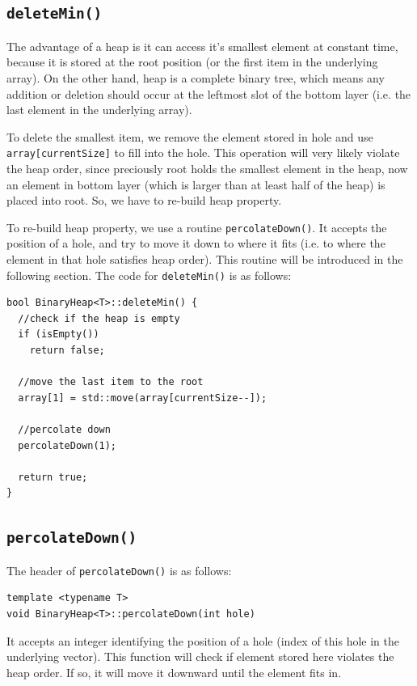 \documentclass[12pt]{book}
\begin{document}
\subsection{\texttt{deleteMin()}}
\label{sec:org3a19483}

The advantage of a heap is it can access it's smallest element at constant time, because it is stored at the root position (or the first item in the underlying array). On the other hand, heap is a complete binary tree, which means any addition or deletion should occur at the leftmost slot of the bottom layer (i.e. the last element in the underlying array).

To delete the smallest item, we remove the element stored in hole and use \texttt{array[currentSize]} to fill into the hole. This operation will very likely violate the heap order, since preciously root holds the smallest element in the heap, now an element in bottom layer (which is larger than at least half of the heap) is placed into root. So, we have to re-build heap property.

To re-build heap property, we use a routine \texttt{percolateDown()}. It accepts the position of a hole, and try to move it down to where it fits (i.e. to where the element in that hole satisfies heap order). This routine will be introduced in the following section. The code for \texttt{deleteMin()} is as follows:
\begin{verbatim}
bool BinaryHeap<T>::deleteMin() {
  //check if the heap is empty 
  if (isEmpty())
    return false;

  //move the last item to the root
  array[1] = std::move(array[currentSize--]);

  //percolate down
  percolateDown(1);

  return true;
}
\end{verbatim}

\subsection{\texttt{percolateDown()}}
\label{sec:org97b85f5}

The header of \texttt{percolateDown()} is as follows:
\begin{verbatim}
template <typename T>
void BinaryHeap<T>::percolateDown(int hole)
\end{verbatim}

It accepts an integer identifying the position of a hole (index of this hole in the underlying vector). This function will check if element stored here violates the heap order. If so, it will move it downward until the element fits in.
\end{document}
